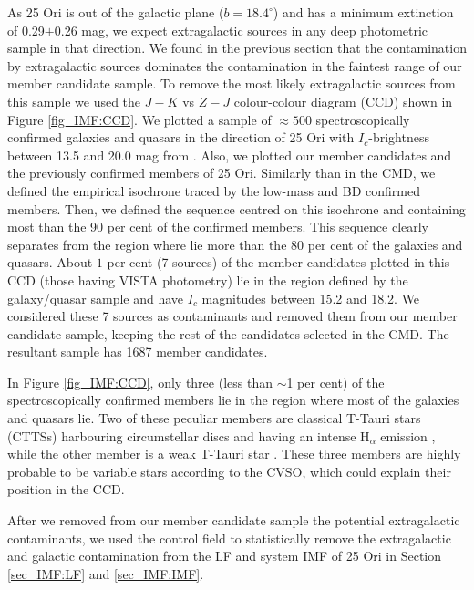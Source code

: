 \documentclass[12pt]{article}
\begin{document}
As 25 Ori is out of the galactic plane ($b=18.4^\circ$) and has a minimum extinction of 0.29$\pm$0.26 mag, we expect extragalactic sources in any deep photometric sample in that direction. We found in the previous section that the contamination by extragalactic sources dominates the contamination in the faintest range of our member candidate sample. To remove the most likely extragalactic sources from this sample we used the $J-K$ vs $Z-J$ colour-colour diagram (\ac{CCD}) shown in Figure \ref{fig_IMF:CCD}. We plotted a sample of $\approx 500$ spectroscopically confirmed galaxies and quasars in the direction of 25 Ori with $I_c$-brightness between 13.5 and 20.0 mag from \cite{Suarez2017}. Also, we plotted our member candidates and the previously confirmed members of 25 Ori. Similarly than in the CMD, we defined the empirical isochrone traced by the low-mass and BD confirmed members. Then, we defined the sequence centred on this isochrone and containing most than the 90 per cent of the confirmed members. This sequence clearly separates from the region where lie more than the $80$ per cent of the galaxies and quasars. About $1$ per cent (7 sources) of the member candidates plotted in this CCD (those having VISTA photometry) lie in the region defined by the galaxy/quasar sample and have $I_c$ magnitudes between 15.2 and 18.2. We considered these 7 sources as contaminants and removed them from our member candidate sample, keeping the rest of the candidates selected in the CMD. The resultant sample has 1687 member candidates.

In Figure \ref{fig_IMF:CCD}, only three (less than $\sim$1 per cent) of the spectroscopically confirmed members lie in the region where most of the galaxies and quasars lie. Two of these peculiar members are classical T-Tauri stars (\ac{CTTS}s) harbouring circumstellar discs and having an intense H$_\alpha$ emission \citep[41 and 53 \AA; ][]{Suarez2017}, while the other member is a weak T-Tauri star \citep[\ac{WTTS}; ][]{Briceno2007}. These three members are highly probable to be variable stars according to the CVSO, which could explain their position in the CCD.

After we removed from our member candidate sample the potential extragalactic contaminants, we used the control field to statistically remove the extragalactic and galactic contamination from the LF and system IMF of 25 Ori in Section \ref{sec_IMF:LF} and \ref{sec_IMF:IMF}.
\end{document}
